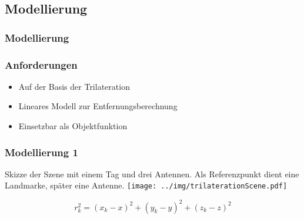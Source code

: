 \subsection{Modellierung}
\begin{frame}
  \frametitle{Modellierung} %
\end{frame}
\begin{frame}
  \frametitle{Anforderungen}
%
\begin{itemize} 
  \item Auf der Basis der Trilateration
  \pause 
  \item Lineares Modell zur Entfernungsberechnung
  \pause 
  \item Einsetzbar als Objektfunktion
\end{itemize} 
	
%
\end{frame}
\begin{frame}
  \frametitle{Modellierung  1}
%
  \begin{center}
	\tiny Skizze der Szene mit einem Tag und drei Antennen. Als Referenzpunkt dient eine Landmarke, später eine Antenne.
%
  	\texttt{[image: ../img/trilaterationScene.pdf]}
  \end{center}
\[
r_k^2= (x_k-x )^2 + (y_k-y )^2 + (z_k-z )^2
\]
\end{frame}
